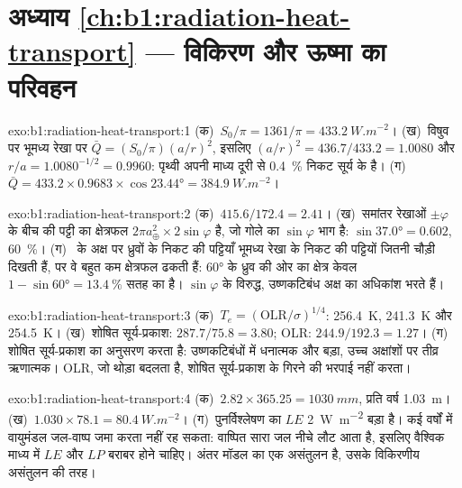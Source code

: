 \section*{अध्याय \ref{ch:b1:radiation-heat-transport} --- विकिरण और ऊष्मा का परिवहन}

\begin{solution}{exo:b1:radiation-heat-transport:1}
(क)~$S_0/\pi = 1361/\pi = \qty{433.2}{W.m^{-2}}$। (ख)~विषुव पर भूमध्य रेखा पर
$\bar Q = (S_0/\pi)(a/r)^2$, इसलिए $(a/r)^2 = 436.7/433.2 = 1.0080$ और $r/a =
1.0080^{-1/2} = 0.9960$: पृथ्वी अपनी माध्य दूरी से \qty{0.4}{\percent} निकट सूर्य के है। (ग)~$\bar Q = 433.2 \times 0.9683 \times \cos\ang{23.44} =
\qty{384.9}{W.m^{-2}}$।
\end{solution}

\begin{solution}{exo:b1:radiation-heat-transport:2}
(क)~$415.6/172.4 = 2.41$। (ख)~समांतर रेखाओं $\pm\varphi$ के बीच की पट्टी का क्षेत्रफल
$2\pi a_\oplus^2 \times 2\sin\varphi$ है, जो गोले का $\sin\varphi$ भाग है: $\sin\ang{37.0} = 0.602$, \qty{60}{\percent}। (ग)~ के अक्ष पर ध्रुवों के निकट की पट्टियाँ भूमध्य रेखा के निकट की पट्टियों जितनी चौड़ी दिखती हैं, पर वे बहुत कम क्षेत्रफल ढकती हैं: \ang{60} के ध्रुव की ओर का क्षेत्र केवल $1 - \sin\ang{60} =
\qty{13.4}{\percent}$ सतह का है। $\sin\varphi$ के विरुद्ध, उष्णकटिबंध अक्ष का अधिकांश भरते हैं।
\end{solution}

\begin{solution}{exo:b1:radiation-heat-transport:3}
(क)~$T_e = (\text{OLR}/\sigma)^{1/4}$: \qty{256.4}{K}, \qty{241.3}{K} और
\qty{254.5}{K}। (ख)~शोषित सूर्य-प्रकाश: $287.7/75.8 = 3.80$; OLR: $244.9/192.3 =
1.27$। (ग)~ शोषित सूर्य-प्रकाश का अनुसरण करता है: उष्णकटिबंधों में धनात्मक और बड़ा, उच्च अक्षांशों पर तीव्र ऋणात्मक। OLR, जो थोड़ा बदलता है, शोषित सूर्य-प्रकाश के गिरने की भरपाई नहीं करता।
\end{solution}

\begin{solution}{exo:b1:radiation-heat-transport:4}
(क)~$2.82 \times 365.25 = \qty{1030}{mm}$, प्रति वर्ष \qty{1.03}{m}। (ख)~$1.030 \times
78.1 = \qty{80.4}{W.m^{-2}}$।
(ग)~पुनर्विश्लेषण का $LE$ \qty{2}{W.m^{-2}} बड़ा है। कई वर्षों में वायुमंडल जल-वाष्प जमा करता नहीं रह सकता: वाष्पित सारा जल नीचे लौट आता है, इसलिए वैश्विक माध्य में $LE$ और $LP$ बराबर होने चाहिए। अंतर मॉडल का एक असंतुलन है, उसके विकिरणीय असंतुलन की तरह।
\end{solution}


